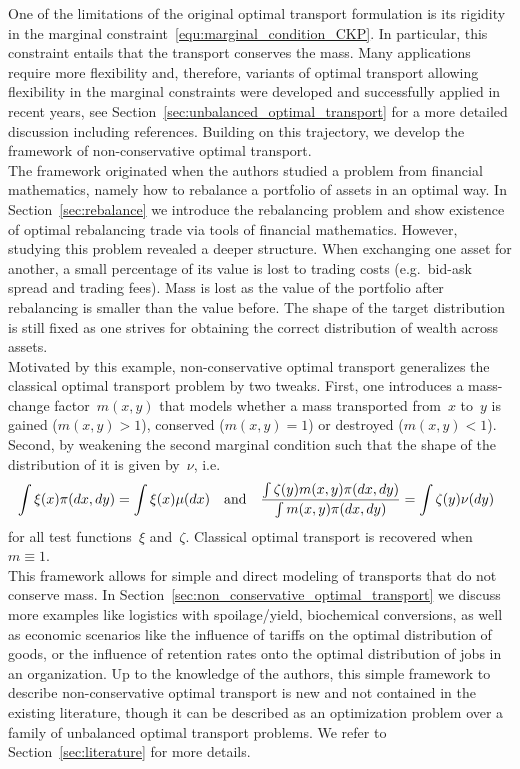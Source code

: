 \documentclass{article}
\theoremstyle{definition}
\begin{document}
One of the limitations of the original optimal transport formulation is its rigidity in the marginal constraint~\eqref{equ:marginal_condition_CKP}. In particular, this constraint entails that the transport conserves the mass. Many applications require more flexibility and, therefore, variants of optimal transport allowing flexibility in the marginal constraints were developed and successfully applied in recent years, see Section~\ref{sec:unbalanced_optimal_transport} for a more detailed discussion including references. 
Building on this trajectory, we develop the framework of non-conservative optimal transport. \\

The framework originated when the authors studied a problem from financial mathematics, namely how to rebalance a portfolio of assets in an optimal way. In Section~\ref{sec:rebalance} we introduce the rebalancing problem and show existence of optimal rebalancing trade via tools of financial mathematics. However, studying this problem revealed a deeper structure. When exchanging one asset for another, a small percentage of its value is lost to trading costs (e.g.~bid-ask spread and trading fees). Mass is lost as the value of the portfolio after rebalancing is smaller than the value before. The shape of the target distribution is still fixed as one strives for obtaining the correct distribution of wealth across assets.\\

Motivated by this example, non-conservative optimal transport generalizes the classical optimal transport problem by two tweaks. First, one introduces a mass-change factor~$m(x,y)$ that models whether a mass transported from~$x$ to~$y$ is gained ($m(x,y) >1$), conserved ($m(x,y) =1$) or destroyed ($m(x,y) <1$).  Second, by weakening the second marginal condition such that the shape of the distribution of it is given by~$\nu$, i.e.
\begin{align}\label{equ:marginal_condition_KP} \hspace{-0.2cm}
    \int \xi(x) \pi(dx, dy) = \int \xi(x)\mu(dx) \quad \mbox{and} \quad  \frac{\int \zeta(y) m(x,y)\pi(dx, dy)}{\int m(x,y) \pi(dx,dy)} = \int \zeta(y)\nu(dy)
\end{align}
for all test functions~$\xi$ and~$\zeta$. Classical optimal transport is recovered  when $m \equiv 1$. \\

This framework allows for simple and direct modeling of transports that do not conserve mass. In Section~\ref{sec:non_conservative_optimal_transport} we discuss more examples like logistics with spoilage/yield, biochemical conversions, as well as economic scenarios like the influence of tariffs on the optimal distribution of goods, or the influence of retention rates onto the optimal distribution of jobs in an organization. Up to the knowledge of the authors, this simple framework to describe non-conservative optimal transport is new and not contained in the existing literature, though it can be described as an optimization problem over a family of unbalanced optimal transport problems. We refer to Section~\ref{sec:literature} for more details.\\
\end{document}
